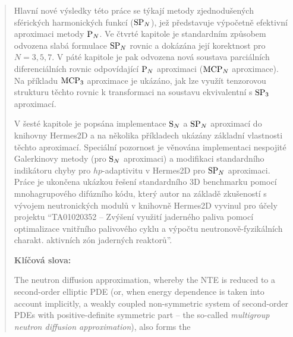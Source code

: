 \begin{alwayssingle}
\begin{quote}
Hlavní nové výsledky této práce se týkají metody zjednodušených sférických harmonických funkcí ($\SPN$), jež představuje
výpočetně efektivní aproximaci metody $\PN$. Ve čtvrté kapitole je standardním \linebreak způsobem odvozena slabá
formulace $\SPN$ rovnic a dokázána její korektnost pro $N = 3,5,7$. V páté kapitole je pak odvozena
nová soustava parciálních diferenciálních rovnic odpovídající $\PN$ aproximaci ($\MCPN$ aproximace). Na příkladu $\MCPN[3]$ aproximace je ukázáno, jak lze využít
tenzorovou strukturu těchto rovnic k transformaci na soustavu ekvivalentní s $\SPN[3]$ aproximací.

V šesté kapitole je popsána implementace $\SN$ a $\SPN$ aproximací do knihovny Hermes2D a na několika
příkladech ukázány základní vlastnosti těchto aproximací.  Speciální pozornost je věnována implementaci nespojité
Galerkinovy metody (pro $\SN$ aproximaci)%
a modifikaci standardního indikátoru chyby pro
$hp$-adaptivitu v Hermes2D pro $\SPN$ aproximaci. Práce je ukončena ukázkou řešení standardního 3D benchmarku pomocí
mnohagrupového difúzního kódu, který autor na základě zkušeností s vývojem neutronických modulů v knihovně Hermes2D
vyvinul pro účely projektu ``TA01020352 -- Zvýšení využití jaderného paliva pomocí optimalizace vnitřního palivového
cyklu a výpočtu neutronově-fyzikálních charakt. aktivních zón jaderných reaktorů''.



  \vspace*{1cm}
{\large \bfseries  Klíčová slova:}


The neutron diffusion approximation, whereby the NTE is reduced to a second-order elliptic PDE (or, when energy
dependence is taken into account implicitly, a weakly coupled non-symmetric system of second-order PDEs with
positive-definite symmetric part -- the so-called \textit{multigroup neutron diffusion approximation}), also forms the


\end{quote}

\end{alwayssingle}


